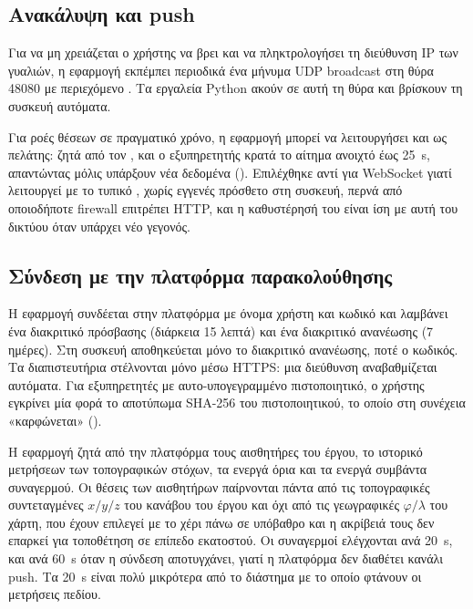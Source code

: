 \subsection{Ανακάλυψη και push}
\label{sec:comm-push}

Για να μη χρειάζεται ο χρήστης να βρει και να πληκτρολογήσει τη διεύθυνση IP των γυαλιών, η εφαρμογή εκπέμπει περιοδικά ένα μήνυμα UDP broadcast στη θύρα 48080 με περιεχόμενο . Τα εργαλεία Python ακούν σε αυτή τη θύρα και βρίσκουν τη συσκευή αυτόματα.

Για ροές θέσεων σε πραγματικό χρόνο, η εφαρμογή μπορεί να λειτουργήσει και ως πελάτης: ζητά  από τον , και ο εξυπηρετητής κρατά το αίτημα ανοιχτό έως \SI{25}{s}, απαντώντας μόλις υπάρξουν νέα δεδομένα (). Επιλέχθηκε αντί για WebSocket γιατί λειτουργεί με το τυπικό , χωρίς εγγενές πρόσθετο στη συσκευή, περνά από οποιοδήποτε firewall επιτρέπει HTTP, και η καθυστέρησή του είναι ίση με αυτή του δικτύου όταν υπάρχει νέο γεγονός.

\subsection{Σύνδεση με την πλατφόρμα παρακολούθησης}
\label{sec:comm-terraweb}

Η εφαρμογή συνδέεται στην πλατφόρμα με όνομα χρήστη και κωδικό και λαμβάνει ένα διακριτικό πρόσβασης (διάρκεια 15 λεπτά) και ένα διακριτικό ανανέωσης (7 ημέρες). Στη συσκευή αποθηκεύεται μόνο το διακριτικό ανανέωσης, ποτέ ο κωδικός. Τα διαπιστευτήρια στέλνονται μόνο μέσω HTTPS: μια διεύθυνση  αναβαθμίζεται αυτόματα. Για εξυπηρετητές με αυτο-υπογεγραμμένο πιστοποιητικό, ο χρήστης εγκρίνει μία φορά το αποτύπωμα SHA-256 του πιστοποιητικού, το οποίο στη συνέχεια «καρφώνεται» ().

Η εφαρμογή ζητά από την πλατφόρμα τους αισθητήρες του έργου, το ιστορικό μετρήσεων των τοπογραφικών στόχων, τα ενεργά όρια και τα ενεργά συμβάντα συναγερμού. Οι θέσεις των αισθητήρων παίρνονται πάντα από τις τοπογραφικές συντεταγμένες $x/y/z$ του κανάβου του έργου και όχι από τις γεωγραφικές $\varphi/\lambda$ του χάρτη, που έχουν επιλεγεί με το χέρι πάνω σε υπόβαθρο και η ακρίβειά τους δεν επαρκεί για τοποθέτηση σε επίπεδο εκατοστού. Οι συναγερμοί ελέγχονται ανά \SI{20}{s}, και ανά \SI{60}{s} όταν η σύνδεση αποτυγχάνει, γιατί η πλατφόρμα δεν διαθέτει κανάλι push. Τα \SI{20}{s} είναι πολύ μικρότερα από το διάστημα με το οποίο φτάνουν οι μετρήσεις πεδίου.

